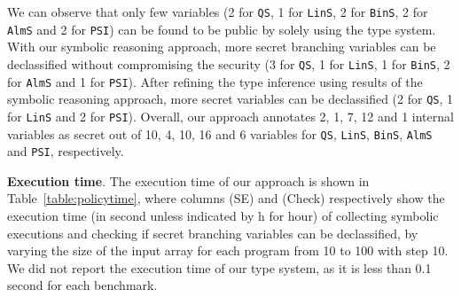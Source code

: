 We can observe that only few variables (2 for \texttt{QS}, 1 for \texttt{LinS}, 2 for \texttt{BinS}, 2 for \texttt{AlmS} and 2 for \texttt{PSI})
can be found to be public by solely using the type system.
With our symbolic reasoning approach, more secret branching variables can be declassified
without compromising the security (3 for \texttt{QS}, 1 for \texttt{LinS}, 1 for \texttt{BinS}, 2 for \texttt{AlmS} and 1 for \texttt{PSI}).
After refining the type inference using results of the symbolic reasoning approach,
more secret variables can be declassified (2 for \texttt{QS}, 1 for \texttt{LinS} and 2 for \texttt{PSI}).
Overall, our approach annotates 2, 1, 7, 12 and 1 internal variables as secret out of
10, 4, 10, 16 and 6 variables for \texttt{QS}, \texttt{LinS}, \texttt{BinS}, \texttt{AlmS} and \texttt{PSI}, respectively.
%
%

\smallskip
\noindent
{\bf Execution time}. The execution time of our approach is shown in Table~\ref{table:policytime},
where columns (SE) and (Check) respectively show the execution time (in second unless indicated by h for hour) of collecting symbolic executions
and checking if secret branching variables can be declassified, by varying
the size of the input array for each program from 10 to 100 with step 10.
We did not report the execution time of our type system, as
it is less than 0.1 second for each benchmark.

